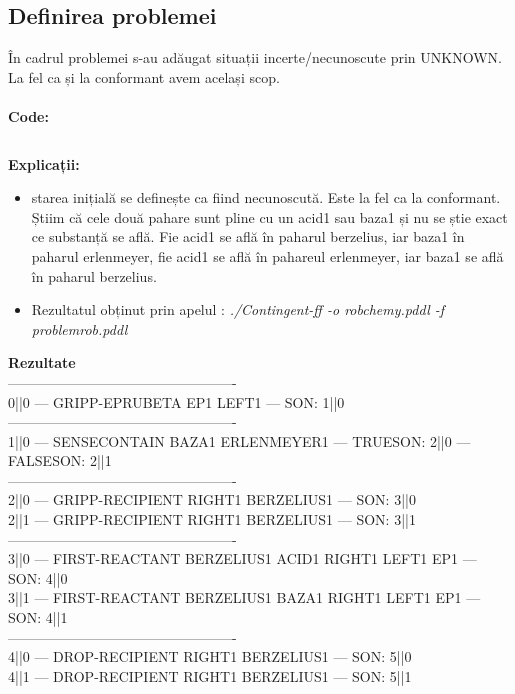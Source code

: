 \subsection{Definirea problemei}
În cadrul problemei s-au adăugat situații incerte/necunoscute prin UNKNOWN. La fel ca și la conformant avem același scop.\\ \\
\textbf{Code:}
\inputminted[linenos]{python}{code/Contingent/problemrob.pddl}
\textbf{Explicații:}
\begin{itemize}
    \setlength\itemsep{0em}
    \item starea inițială se definește ca fiind necunoscută. Este la fel ca la conformant. Știim că cele două pahare sunt pline cu un acid1 sau baza1 și nu se știe exact ce substanță se află. Fie acid1 se află în paharul berzelius, iar baza1 în paharul erlenmeyer, fie acid1 se află în pahareul erlenmeyer, iar baza1 se află în paharul berzelius.
    \item Rezultatul obținut prin apelul : \textit{./Contingent-ff -o robchemy.pddl -f problemrob.pddl}\\
\end{itemize}
\textbf{Rezultate}\\
-------------------------------------------------\\
  0||0 --- GRIPP-EPRUBETA EP1 LEFT1 --- SON: 1||0\\
-------------------------------------------------\\
  1||0 --- SENSECONTAIN BAZA1 ERLENMEYER1 --- TRUESON: 2||0 --- FALSESON: 2||1\\
-------------------------------------------------\\
  2||0 --- GRIPP-RECIPIENT RIGHT1 BERZELIUS1 --- SON: 3||0\\
  2||1 --- GRIPP-RECIPIENT RIGHT1 BERZELIUS1 --- SON: 3||1\\
-------------------------------------------------\\
  3||0 --- FIRST-REACTANT BERZELIUS1 ACID1 RIGHT1 LEFT1 EP1 --- SON: 4||0\\
  3||1 --- FIRST-REACTANT BERZELIUS1 BAZA1 RIGHT1 LEFT1 EP1 --- SON: 4||1\\
-------------------------------------------------\\
  4||0 --- DROP-RECIPIENT RIGHT1 BERZELIUS1 --- SON: 5||0\\
  4||1 --- DROP-RECIPIENT RIGHT1 BERZELIUS1 --- SON: 5||1\\
